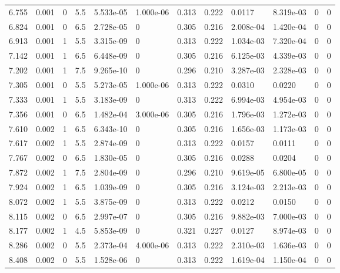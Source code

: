 \documentclass[preview]{standalone}
\begin{document}
{{{\begin{tabular}{L{1.2cm}C{1.2cm} C{0.3cm}C{0.5cm} C{1.4cm}C{1.4cm} C{1.4cm}C{1.4cm} C{1.6cm}C{1.6cm} C{1.6cm}C{1.6cm}}
  6.755  &  0.001  & 0     & 5.5 &  5.533e-05  & 1.000e-06  &  0.313&   0.222& 0.0117 & 8.319e-03   &  0 & 0  \\ 
  6.824  &  0.001  & 0     & 6.5 &  2.728e-05  & 0  &  0.305&   0.216& 2.008e-04 & 1.420e-04   &  0 & 0  \\ 
  6.913  &  0.001  & 1     & 5.5 &  3.315e-09  & 0  &  0.313&   0.222& 1.034e-03 & 7.320e-04   &  0 & 0  \\ 
  7.142  &  0.001  & 1     & 6.5 &  6.448e-09  & 0  &  0.305&   0.216& 6.125e-03 & 4.339e-03   &  0 & 0  \\ 
  7.202  &  0.001  & 1     & 7.5 &  9.265e-10  & 0  &  0.296&   0.210& 3.287e-03 & 2.328e-03   &  0 & 0  \\ 
  7.305  &  0.001  & 0     & 5.5 &  5.273e-05  & 1.000e-06  &  0.313&   0.222& 0.0310 & 0.0220   &  0 & 0  \\ 
  7.333  &  0.001  & 1     & 5.5 &  3.183e-09  & 0  &  0.313&   0.222& 6.994e-03 & 4.954e-03   &  0 & 0  \\ 
  7.356  &  0.001  & 0     & 6.5 &  1.482e-04  & 3.000e-06  &  0.305&   0.216& 1.796e-03 & 1.272e-03   &  0 & 0  \\ 
  7.610  &  0.002  & 1     & 6.5 &  6.343e-10  & 0  &  0.305&   0.216& 1.656e-03 & 1.173e-03   &  0 & 0  \\ 
  7.617  &  0.002  & 1     & 5.5 &  2.874e-09  & 0  &  0.313&   0.222& 0.0157 & 0.0111   &  0 & 0  \\ 
  7.767  &  0.002  & 0     & 6.5 &  1.830e-05  & 0  &  0.305&   0.216& 0.0288 & 0.0204   &  0 & 0  \\ 
  7.872  &  0.002  & 1     & 7.5 &  2.804e-09  & 0  &  0.296&   0.210& 9.619e-05 & 6.800e-05   &  0 & 0  \\ 
  7.924  &  0.002  & 1     & 6.5 &  1.039e-09  & 0  &  0.305&   0.216& 3.124e-03 & 2.213e-03   &  0 & 0  \\ 
  8.072  &  0.002  & 1     & 5.5 &  3.875e-09  & 0  &  0.313&   0.222& 0.0212 & 0.0150   &  0 & 0  \\ 
  8.115  &  0.002  & 0     & 6.5 &  2.997e-07  & 0  &  0.305&   0.216& 9.882e-03 & 7.000e-03   &  0 & 0  \\ 
  8.177  &  0.002  & 1     & 4.5 &  5.853e-09  & 0  &  0.321&   0.227& 0.0127 & 8.974e-03   &  0 & 0  \\ 
  8.286  &  0.002  & 0     & 5.5 &  2.373e-04  & 4.000e-06  &  0.313&   0.222& 2.310e-03 & 1.636e-03   &  0 & 0  \\ 
  8.408  &  0.002  & 0     & 5.5 &  1.528e-06  & 0  &  0.313&   0.222& 1.619e-04 & 1.150e-04   &  0 & 0  \\ 

\end{tabular}}}}
\end{document}
